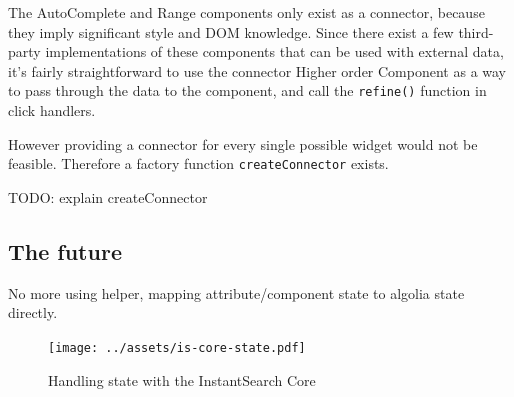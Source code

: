 The AutoComplete and Range components only exist as a connector, because they imply significant style and DOM knowledge. Since there exist a few third-party implementations of these components that can be used with external data, it's fairly straightforward to use the connector Higher order Component as a way to pass through the data to the component, and call the {\tt refine()} function in click handlers. 

However providing a connector for every single possible widget would not be feasible. Therefore a factory function {\tt createConnector} exists.

TODO: explain createConnector



\subsection{The future} %
\label{sub:the_future}

No more using helper, mapping attribute/component state to algolia state directly. %

\begin{figure}[H]
\label{figure:is-core-state}
  \centering
  \texttt{[image: ../assets/is-core-state.pdf]}
  \caption{Handling state with the InstantSearch Core}
\end{figure}


